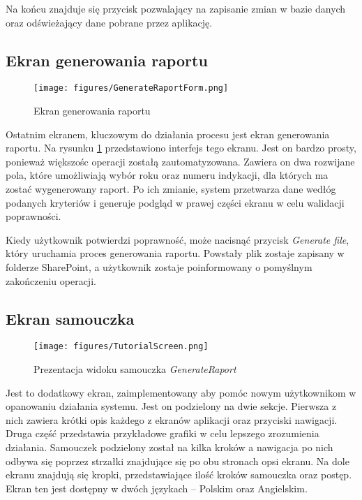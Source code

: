  Na końcu znajduje się przycisk pozwalający na zapisanie zmian w bazie danych oraz odświeżający dane pobrane przez aplikację.

 \subsection{Ekran generowania raportu}

 \begin{figure}[H]
     \centering
     \texttt{[image: figures/GenerateRaportForm.png]}
     \caption{Ekran generowania raportu}
     \label{fig:generateraportform}
 \end{figure}

 Ostatnim ekranem, kluczowym do działania procesu jest ekran generowania raportu. Na rysunku \ref{fig:generateraportform} przedstawiono interfejs tego ekranu. Jest on bardzo prosty, ponieważ większośc operacji zostałą zautomatyzowana. Zawiera on dwa rozwijane pola, które umożliwiają wybór roku oraz numeru indykacji, dla których ma zostać wygenerowany raport. Po ich zmianie, system przetwarza dane wedłóg podanych kryteriów i generuje podgląd w prawej części ekranu w celu walidacji poprawności.

 Kiedy użytkownik potwierdzi poprawność, może nacisnąć przycisk \emph{Generate file}, który uruchamia proces generowania raportu. Powstały plik zostaje zapisany w folderze SharePoint, a użytkownik zostaje poinformowany o pomyślnym zakończeniu operacji.

 \subsection{Ekran samouczka}

 \begin{figure}[H]
    \centering
    \texttt{[image: figures/TutorialScreen.png]}
    \caption{Prezentacja widoku samouczka \emph{GenerateRaport}}
    \label{fig:tutorial}
\end{figure}

Jest to dodatkowy ekran, zaimplementowany aby pomóc nowym użytkownikom w opanowaniu działania systemu. Jest on podzielony na dwie sekcje. Pierwsza z nich zawiera krótki opis każdego z ekranów aplikacji oraz przyciski nawigacji. Druga część przedstawia przykładowe grafiki w celu lepszego zrozumienia działania. Samouczek podzielony został na kilka kroków a nawigacja po nich odbywa się poprzez strzałki znajdujące się po obu stronach opsi ekranu. Na dole ekranu znajdują się kropki, przedstawiające ilość kroków samouczka oraz postęp. Ekran ten jest dostępny w dwóch językach -- Polskim oraz Angielskim. 
